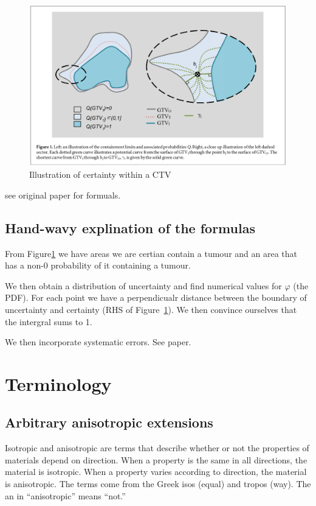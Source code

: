 \documentclass[11pt]{article}
\begin{document}
\begin{figure}[H]
    \centering
    \includegraphics[width=\textwidth]{images/PDF-of-CTV.png}
    \caption{Illustration of certainty within a CTV}
    \label{fig:pdf-of-ctv}
\end{figure}

see original paper for formuals.

\subsection{Hand-wavy explination of the formulas}

From Figure\ref{fig:pdf-of-ctv} we have areas we are certian contain a tumour and an area that has a non-0 probability of it containing a tumour. 

We then obtain a distribution of uncertainty and find numerical values for $\varphi$ (the PDF). For each point we have a perpendicualr distance between the boundary of uncertainty and certainty (RHS of Figure~\ref{fig:pdf-of-ctv}). We then convince ourselves that the intergral sums to 1.

We then incorporate systematic errors. See paper.

\section{Terminology}

\subsection{Arbitrary anisotropic extensions} \label{term:arbitrary-anisotropic-extensions}

Isotropic and anisotropic are terms that describe whether or not the properties of materials depend on direction. When a property is the same in all directions, the material is isotropic. When a property varies according to direction, the material is anisotropic. The terms come from the Greek isos (equal) and tropos (way). The an in “anisotropic” means “not.”~\cite{anisotropy}
\end{document}
